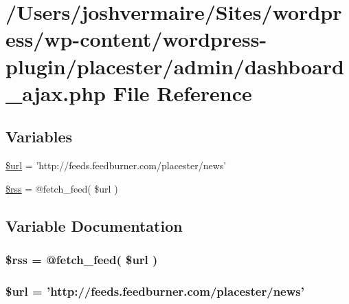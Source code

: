 \hypertarget{dashboard__ajax_8php}{
\section{/Users/joshvermaire/Sites/wordpress/wp-\/content/wordpress-\/plugin/placester/admin/dashboard\_\-ajax.php File Reference}
\label{df/daf/dashboard__ajax_8php}
}
\subsection*{Variables}
\begin{DoxyCompactItemize}
\item 
\hyperlink{dashboard__ajax_8php_acf215f34a917d014776ce684a9ee8909}{\$url} = 'http://feeds.feedburner.com/placester/news'
\item 
\hyperlink{dashboard__ajax_8php_a3db35245d8994154582c97120912c2cb}{\$rss} = @fetch\_\-feed( \$url )
\end{DoxyCompactItemize}


\subsection{Variable Documentation}
\hypertarget{dashboard__ajax_8php_a3db35245d8994154582c97120912c2cb}{
\subsubsection[{\$rss}]{\setlength{\rightskip}{0pt plus 5cm}\$rss = @fetch\_\-feed( \$url )}}
\label{df/daf/dashboard__ajax_8php_a3db35245d8994154582c97120912c2cb}
\hypertarget{dashboard__ajax_8php_acf215f34a917d014776ce684a9ee8909}{
\subsubsection[{\$url}]{\setlength{\rightskip}{0pt plus 5cm}\$url = 'http://feeds.feedburner.com/placester/news'}}
\label{df/daf/dashboard__ajax_8php_acf215f34a917d014776ce684a9ee8909}
